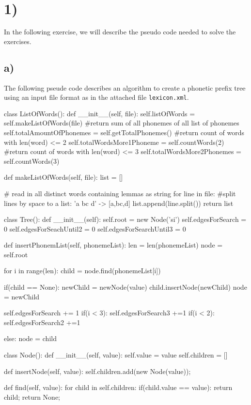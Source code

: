 \section*{1)} %

In the following exercise, we will describe the pseudo code needed to solve the exercises.

\subsection*{a)} %
\label{sub:a}

The following pseude code describes an algorithm to create a phonetic prefix tree using 
an input file format as in the attached file \lstinline|lexicon.xml|.

\begin{python}
class ListOfWords():
	def __init__(self, file):
		self.listOfWords = self.makeListOfWords(file)
		#return sum of all phonemes of all list of phonemes
		self.totalAmountOfPhonemes = self.getTotalPhonemes() 
		#return count of words with len(word) <= 2
		self.totalWordsMore1Phoneme = self.countWords(2)
		#return count of words with len(word) <= 3 
		self.totalWordsMore2Phonemes = self.countWords(3) 

	def makeListOfWords(self, file):
		list = []

		# read in all distinct words containing lemmas as string
		for line in file:
			#split lines by space to a list: 'a bc d' -> [a,bc,d]
			list.append(line.split()) 
		return list
		
class Tree():
	def __init__(self):
		self.root = new Node('si')
		self.edgesForSearch = 0
		self.edgesForSeachUntil2 = 0
		self.edgesForSearchUntil3 = 0

	def insertPhonemList(self, phonemeList): 
		len = len(phonemeList)
		node = self.root

		for i in range(len):
			child = node.find(phonemeList[i])

			if(child == None):
				newChild = newNode(value)
				child.insertNode(newChild)
				node = newChild

				self.edgesForSearch += 1
				if(i < 3):
					self.edgesForSearch3 +=1 
					if(i < 2):
						self.edgesForSearch2 +=1

			else:
				node = child

class Node():
   def __init__(self, value):
   	   self.value = value
       self.children = [] 

   def insertNode(self, value):
   	   self.children.add(new Node(value));

   def find(self, value):
   	   for child in self.children: 
   	   		if(child.value == value): 
   	   			return child;
   	   return None;
\end{python}

